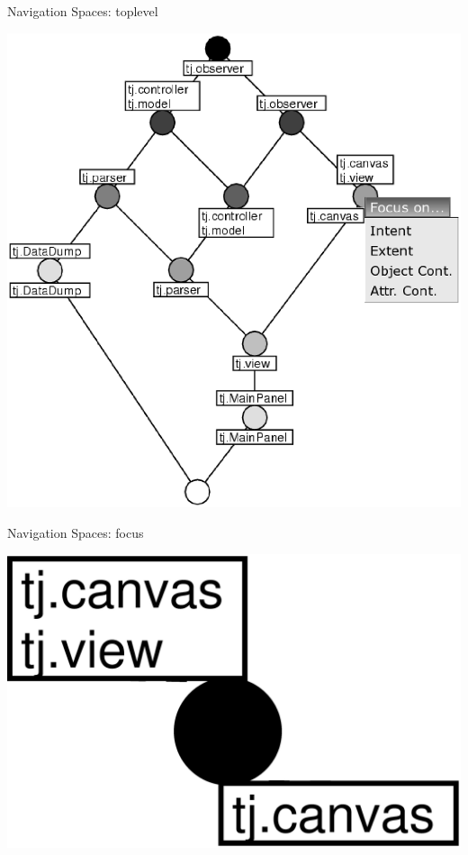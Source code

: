 \documentclass[pdf,prettybox]{prosper}
\begin{document}
\begin{slide}{Navigation Spaces: toplevel}
 \begin{center}
  \includegraphics[height=0.8 \textheight]{img/callgraph-1.eps}
 \end{center}
\end{slide}

\begin{slide}{Navigation Spaces: focus}
 \begin{center}
  \includegraphics[height=0.3 \textheight]{img/callgraph-2.eps}
 \end{center}
\end{slide}
\end{document}
